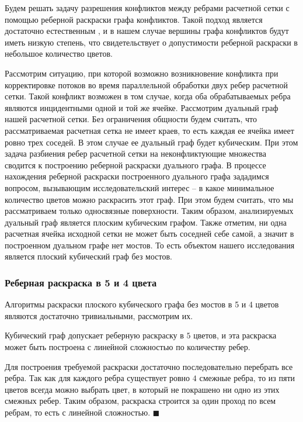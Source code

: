 Будем решать задачу разрешения конфликтов между ребрами расчетной сетки с помощью реберной раскраски графа конфликтов.
Такой подход является достаточно естественным \cite{Gilfanov2021Coloring}, и в нашем случае вершины графа конфликтов будут иметь низкую степень, что свидетельствует о допустимости реберной раскраски в небольшое количество цветов.

Рассмотрим ситуацию, при которой возможно возникновение конфликта при корректировке потоков во время параллельной обработки двух ребер расчетной сетки.
Такой конфликт возможен в том случае, когда оба обрабатываемых ребра являются инцидентными одной и той же ячейке.
Рассмотрим дуальный граф нашей расчетной сетки.
Без ограничения общности будем считать, что рассматриваемая расчетная сетка не имеет краев, то есть каждая ее ячейка имеет ровно трех соседей.
В этом случае ее дуальный граф будет кубическим.
При этом задача разбиения ребер расчетной сетки на неконфликтующие множества сводится к построению реберной раскраски дуального графа.
В процессе нахождения реберной раскраски построенного дуального графа зададимся вопросом, вызывающим  исследовательский интерес -- в какое минимальное количество цветов можно раскрасить этот граф.
При этом будем считать, что мы рассматриваем только односвязные поверхности.
Таким образом, анализируемых дуальный граф является плоским кубическим графом.
Также отметим, ни одна расчетная ячейка исходной сетки не может быть соседней себе самой, а значит в построенном дуальном графе нет мостов.
То есть объектом нашего исследования является плоский кубический граф без мостов.

\subsubsection{Реберная раскраска в 5 и 4 цвета}

Алгоритмы раскраски плоского кубического графа без мостов в 5 и 4 цветов являются достаточно тривиальными, рассмотрим их.

\begin{lemma}\label{lem:text_3_graph_prim_coloring5}
Кубический граф допускает реберную раскраску в $5$ цветов, и эта раскраска может быть построена с линейной сложностью по количеству ребер.
\end{lemma}
Для построения требуемой раскраски достаточно последовательно перебрать все ребра.
Так как для каждого ребра существует ровно $4$ смежные ребра, то из пяти цветов всегда можно выбрать цвет, в который не покрашено ни одно из этих смежных ребер.
Таким образом, раскраска строится за один проход по всем ребрам, то есть с линейной сложностью.
$\blacksquare$\\

